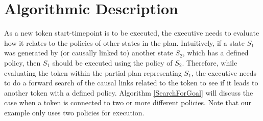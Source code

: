 %
%
%
%
%



\section{Algorithmic Description}
\label{sec:algo}

As a new token start-timepoint is to be executed, the executive needs
to evaluate how it relates to the policies of other states in the
plan. Intuitively, if a state $S_1$ was generated by (or causally
linked to) another state $S_2$, which has a defined policy, then $S_1$
should be executed using the policy of $S_2$. Therefore, while
evaluating the token within the partial plan representing $S_1$, the
executive needs to do a forward search of the causal links related to
the token to see if it leads to another token with a defined
policy. Algorithm \ref{SearchForGoal} will discuss the case when a
token is connected to two or more different policies. Note that our
example only uses two policies for execution.  %



